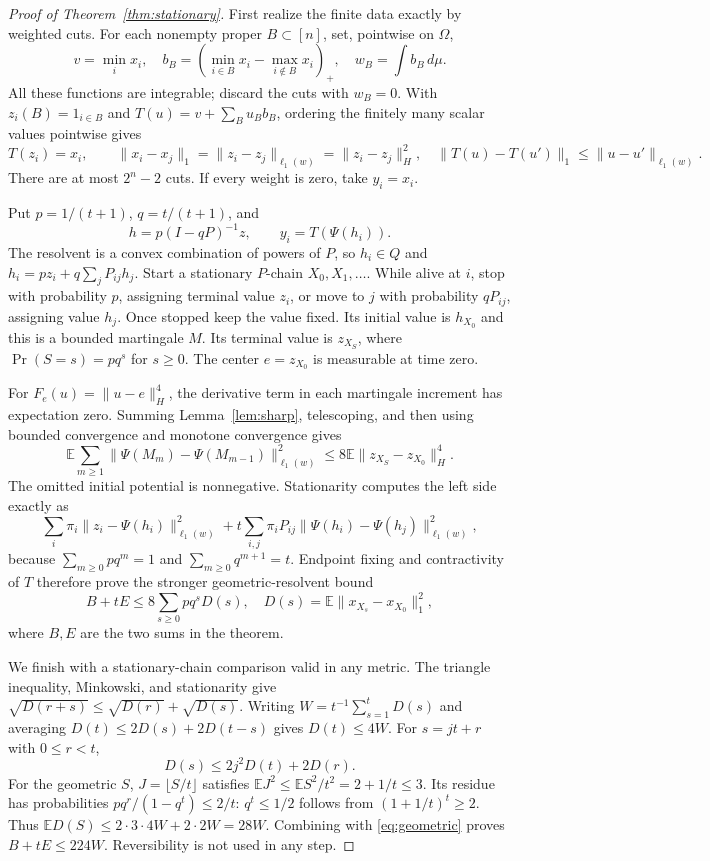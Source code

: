 \documentclass[11pt]{article}
\theoremstyle{remark}\newtheorem{remark}[theorem]{Remark}
\begin{document}
\begin{proof}[Proof of Theorem~\ref{thm:stationary}]
First realize the finite data exactly by weighted cuts. For each nonempty
proper $B\subset[n]$, set, pointwise on $\Omega$,
\[
 v=\min_i x_i,\quad
 b_B=\left(\min_{i\in B}x_i-\max_{i\notin B}x_i\right)_+,
 \quad w_B=\int b_B\,d\mu.
\]
All these functions are integrable; discard the cuts with $w_B=0$.
With $z_i(B)=1_{i\in B}$ and $T(u)=v+\sum_Bu_Bb_B$, ordering the finitely
many scalar values pointwise gives
\[
 T(z_i)=x_i,\qquad
 \|x_i-x_j\|_1=\|z_i-z_j\|_{\ell_1(w)}=\|z_i-z_j\|_H^2,
\quad
 \|T(u)-T(u')\|_1\leq\|u-u'\|_{\ell_1(w)}.
\]
There are at most $2^n-2$ cuts. If every weight is zero, take $y_i=x_i$.

Put $p=1/(t+1)$, $q=t/(t+1)$, and
\[
 h=p(I-qP)^{-1}z,\qquad y_i=T(\Psi(h_i)).
\]
The resolvent is a convex combination of powers of $P$, so $h_i\in Q$ and
$h_i=pz_i+q\sum_jP_{ij}h_j$.
Start a stationary $P$-chain $X_0,X_1,\ldots$. While alive at $i$, stop with
probability $p$, assigning terminal value $z_i$, or move to $j$ with
probability $qP_{ij}$, assigning value $h_j$. Once stopped keep the value
fixed. Its initial value is $h_{X_0}$ and this is a bounded martingale $M$.
Its terminal value is $z_{X_S}$, where $\Pr(S=s)=pq^s$ for $s\geq0$.
The center $e=z_{X_0}$ is measurable at time zero.

For $F_e(u)=\|u-e\|_H^4$, the derivative term in each martingale increment
has expectation zero. Summing Lemma~\ref{lem:sharp}, telescoping, and then
using bounded convergence and monotone convergence gives
\[
 \mathbb E\sum_{m\geq1}\|\Psi(M_m)-\Psi(M_{m-1})\|_{\ell_1(w)}^2
 \leq8\mathbb E\|z_{X_S}-z_{X_0}\|_H^4.
\]
The omitted initial potential is nonnegative. Stationarity computes the
left side exactly as
\[
 \sum_i\pi_i\|z_i-\Psi(h_i)\|_{\ell_1(w)}^2
 +t\sum_{i,j}\pi_iP_{ij}\|\Psi(h_i)-\Psi(h_j)\|_{\ell_1(w)}^2,
\]
because $\sum_{m\geq0}pq^m=1$ and $\sum_{m\geq0}q^{m+1}=t$.
Endpoint fixing and contractivity of $T$ therefore prove the stronger
geometric-resolvent bound
\begin{equation}\label{eq:geometric}
 B+tE\leq8\sum_{s\geq0}pq^s D(s),\quad
 D(s)=\mathbb E\|x_{X_s}-x_{X_0}\|_1^2,
\end{equation}
where $B,E$ are the two sums in the theorem.

We finish with a stationary-chain comparison valid in any metric.
The triangle inequality, Minkowski, and stationarity give
$\sqrt{D(r+s)}\leq\sqrt{D(r)}+\sqrt{D(s)}$.
Writing $W=t^{-1}\sum_{s=1}^t D(s)$ and averaging
$D(t)\leq2D(s)+2D(t-s)$ gives $D(t)\leq4W$.
For $s=jt+r$ with $0\leq r<t$,
\[
 D(s)\leq2j^2D(t)+2D(r).
\]
For the geometric $S$, $J=\lfloor S/t\rfloor$ satisfies
$\mathbb EJ^2\leq\mathbb ES^2/t^2=2+1/t\leq3$.
Its residue has probabilities $pq^r/(1-q^t)\leq2/t$:
$q^t\leq1/2$ follows from $(1+1/t)^t\geq2$.
Thus $\mathbb ED(S)\leq2\cdot3\cdot4W+2\cdot2W=28W$.
Combining with \eqref{eq:geometric} proves $B+tE\leq224W$.
Reversibility is not used in any step.
\end{proof}
\end{document}
